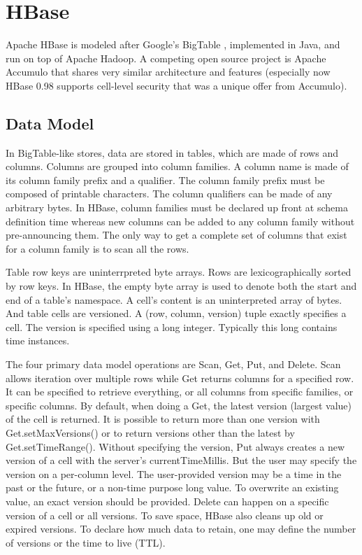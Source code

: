 \documentclass[11pt]{book}
\begin{document}
\section[HBase]
{HBase}
Apache HBase \cite{HBase} is modeled after Google's BigTable \cite{Chang:2006:BDS}, implemented in Java, and run on top of Apache Hadoop. A competing open source project is Apache Accumulo \cite{Accumulo} that shares very similar architecture and features (especially now HBase 0.98 supports cell-level security that was a unique offer from Accumulo).

\subsection{Data Model}

In BigTable-like stores, data are stored in tables, which are made of rows and columns. Columns are grouped into column families. A column name is made of its column family prefix and a qualifier. The column family prefix must be composed of printable characters. The column qualifiers can be made of any arbitrary bytes. In HBase, column families must be declared up front at schema definition time whereas new columns can be added to any column family without pre-announcing them. The only way to get a complete set of columns that exist for a column family is to scan all the rows.

Table row keys are uninterrpreted byte arrays. Rows are lexicographically sorted by row keys. In HBase, the empty byte array is used to denote both the start and end of a table's namespace.
A cell's content is an uninterpreted array of bytes. And table cells are versioned. A (row, column, version) tuple exactly specifies a cell. The version is specified using a long integer. Typically this long contains time instances.

The four primary data model operations are Scan, Get, Put, and Delete. Scan allows iteration over multiple rows while Get returns columns for a specified row. It can be specified to retrieve everything, or all columns from specific families, or specific columns.
By default, when doing a Get, the latest version (largest value) of the cell is returned. It is possible to return more than one version with Get.setMaxVersions() or to return versions other than the latest by Get.setTimeRange(). Without specifying the version, Put always creates a new version of a cell with the server's currentTimeMillis. But the user may specify the version on a per-column level. The user-provided version may be a time in the past or the future, or a non-time purpose long value. To overwrite an existing value, an exact version should be provided. Delete can happen on a specific version of a cell or all versions. To save space, HBase also cleans up old or expired versions. To declare how much data to retain, one may define the number of versions or the time to live (TTL).
\end{document}
